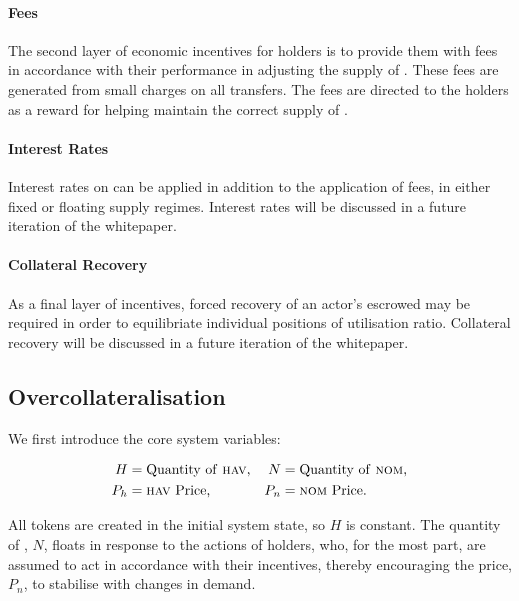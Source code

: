 \paragraph{Fees}

\noindent The second layer of economic incentives for \HAV{} holders is to provide them with fees in accordance with their performance in adjusting the supply of \NOM{}. These fees are generated from small charges on all \NOM{} transfers. The fees are directed to the \HAV{} holders as a reward for helping maintain the correct supply of \NOM{}.

\paragraph{Interest Rates}

\noindent Interest rates on \HAV{} can be applied in addition to the application of fees, in either fixed or floating \HAV{} supply regimes. Interest rates will be discussed in a future iteration of the whitepaper.

\paragraph{Collateral Recovery}

\noindent As a final layer of incentives, forced recovery of an actor's escrowed \HAV{} may be required in order to equilibriate individual positions of utilisation ratio. Collateral recovery will be discussed in a future iteration of the whitepaper.

\subsection{Overcollateralisation}

\noindent We first introduce the core system variables:

\begin{align*}
H &= \text{Quantity of \textsc{hav}{},} & N &= \text{Quantity of \textsc{nom}{},} \\
P_h &= \text{\textsc{hav}{} Price,}  & P_n &= \text{\textsc{nom}{} Price.}
\end{align*}

\noindent All \HAV{} tokens are created in the initial system state, so $H$ is constant. The quantity of \NOM{}, $N$, floats in response to the actions of \HAV{} holders, who, for the most part, are assumed to act in accordance with their incentives, thereby encouraging the \NOM{} price, $P_n$, to stabilise with changes in demand.


